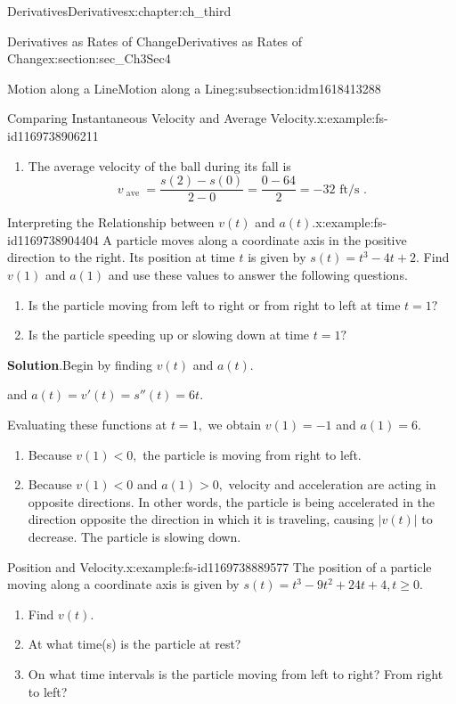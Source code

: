 \documentclass[oneside,10pt,]{book}
\newcommand{\blocktitlefont}{\relax}
\numberwithin{equation}{section}
\newcommand{\lt}{<}
\newcommand{\gt}{>}
\begin{document}
\begin{chapterptx}{Derivatives}{}{Derivatives}{}{}{x:chapter:ch_third}
\begin{sectionptx}{Derivatives as Rates of Change}{}{Derivatives as Rates of Change}{}{}{x:section:sec_Ch3Sec4}
\begin{subsectionptx}{Motion along a Line}{}{Motion along a Line}{}{}{g:subsection:idm1618413288}
\begin{example}{Comparing Instantaneous Velocity and Average Velocity.}{x:example:fs-id1169738906211}
\begin{enumerate}[label=(\alph*)]
\item{}The average velocity of the ball during its fall is%
\begin{equation*}
v_{\text{ ave }}=\frac{s(2)-s(0)}{2-0}=\frac{0-64}{2}=-32 \text{ ft/s }.
\end{equation*}
%
\end{enumerate}
\end{example}
\begin{example}{Interpreting the Relationship between \(v(t)\) and \(a(t)\).}{x:example:fs-id1169738904404}%
A particle moves along a coordinate axis in the positive direction to the right. Its position at time \(t\) is given by \(s(t)=t^3-4t+2.\) Find \(v(1)\) and \(a(1)\) and use these values to answer the following questions.%
%
\begin{enumerate}[label=(\alph*)]
\item{}Is the particle moving from left to right or from right to left at time \(t=1?\)%
\item{}Is the particle speeding up or slowing down at time \(t=1?\)%
\end{enumerate}
\par\smallskip%
\noindent\textbf{\blocktitlefont Solution}.\hypertarget{g:solution:idm1618394088}{}\quad{}Begin by finding \(v(t)\) and \(a(t).\)%
\par
and \(a(t)=v'(t)=s''(t)=6t.\)%
\par
Evaluating these functions at \(t=1,\) we obtain \(v(1)=-1\) and \(a(1)=6.\)%
%
\begin{enumerate}[label=(\alph*)]
\item{}Because \(v(1)\lt 0,\) the particle is moving from right to left.%
\item{}Because \(v(1)\lt 0\) and \(a(1)\gt 0,\) velocity and acceleration are acting in opposite directions. In other words, the particle is being accelerated in the direction opposite the direction in which it is traveling, causing \(|v(t)|\) to decrease. The particle is slowing down.%
\end{enumerate}
\end{example}
\begin{example}{Position and Velocity.}{x:example:fs-id1169738889577}%
The position of a particle moving along a coordinate axis is given by \(s(t)=t^3-9t^2+24t+4,t\geq 0.\)%
%
\begin{enumerate}[label=(\alph*)]
\item{}Find \(v(t).\)%
\item{}At what time(s) is the particle at rest?%
\item{}On what time intervals is the particle moving from left to right? From right to left?%

\end{enumerate}
\end{example}
\end{subsectionptx}
\end{sectionptx}
\end{chapterptx}
\end{document}
